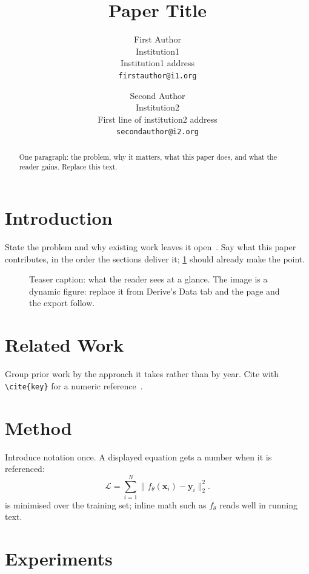 \documentclass[10pt,twocolumn,letterpaper]{article}
\title{Paper Title}
\author{First Author\\
Institution1\\
Institution1 address\\
{\tt\small firstauthor@i1.org}
\and
Second Author\\
Institution2\\
First line of institution2 address\\
{\tt\small secondauthor@i2.org}
}
\begin{document}
\maketitle

\begin{abstract}
One paragraph: the problem, why it matters, what this paper does, and what the reader
gains. Replace this text.
\end{abstract}

\section{Introduction}
\label{sec:intro}

State the problem and why existing work leaves it open~\cite{example2020method}. Say
what this paper contributes, in the order the sections deliver it; \cref{fig:teaser}
should already make the point.

\begin{figure}[t]
  \centering
  \caption{Teaser caption: what the reader sees at a glance. The image is a dynamic
  figure: replace it from Derive's Data tab and the page and the export follow.}
  \label{fig:teaser}
\end{figure}

\section{Related Work}

Group prior work by the approach it takes rather than by year. Cite with
\verb|\cite{key}| for a numeric reference~\cite{example2023survey,example2016book}.

\section{Method}
\label{sec:method}

Introduce notation once. A displayed equation gets a number when it is referenced:
\begin{equation}
  \mathcal{L} = \sum_{i=1}^{N} \big\| f_\theta(\mathbf{x}_i) - \mathbf{y}_i \big\|_2^2 .
  \label{eq:loss}
\end{equation}
 is minimised over the training set; inline math such as $f_\theta$ reads
well in running text.

\section{Experiments}
\label{sec:experiments}
\end{document}
